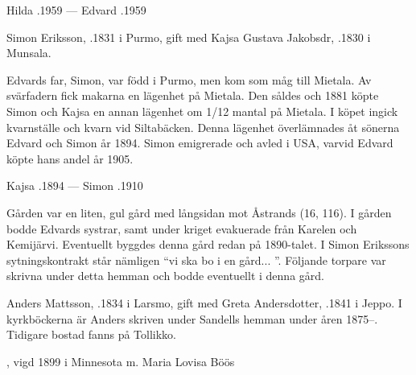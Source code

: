 Hilda .1959  ---  Edvard .1959



Simon Eriksson,  .1831 i Purmo, gift med Kajsa Gustava Jakobsdr, .1830 i Munsala.
\begin{jhchildren}
  \item {}
  \item {}
  \item {}
  \item {}
  \item {}
\end{jhchildren}

Edvards far, Simon, var född i Purmo, men kom som måg till Mietala. Av svärfadern fick makarna en lägenhet på Mietala. Den såldes och 1881 köpte Simon och Kajsa en annan lägenhet om 1/12 mantal på Mietala. I köpet ingick kvarnställe och kvarn vid Siltabäcken. Denna lägenhet överlämnades åt sönerna Edvard och Simon år 1894. Simon emigrerade och avled i USA, varvid Edvard köpte hans andel år 1905.

Kajsa .1894  ---	Simon .1910



Gården var en liten, gul gård med långsidan mot Åstrands (16, 116).	I gården bodde Edvards systrar, samt under kriget evakuerade från Karelen och Kemijärvi. Eventuellt byggdes denna gård redan på 1890-talet. I Simon Erikssons sytningskontrakt står nämligen ``vi ska bo i en gård... ''. Följande torpare var skrivna under detta hemman och bodde eventuellt i denna gård.


Anders Mattsson, .1834 i Larsmo, gift med Greta Andersdotter, .1841 i Jeppo. I kyrkböckerna är Anders skriven under Sandells hemman under åren 1875--. Tidigare bostad fanns på Tollikko.
\begin{jhchildren}
  \item {}, vigd 1899 i  Minnesota m. Maria Lovisa Böös
  \item {}
\end{jhchildren}


